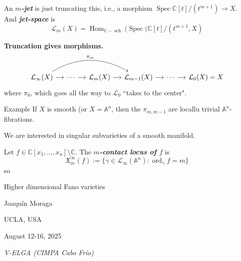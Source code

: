 \begin{defn}\leavevmode
	An \textit{\textbf{\(m\)-jet}} is just truncating this, i.e., a morphism \(\operatorname{Spec}\mathbb{C}[t]/(t^{m+1}) \to X\). And \textit{\textbf{jet-space}} is
	\[\mathcal{L}_m(X)= \operatorname{Hom}_{\mathbb{C}-\operatorname{s c h}}(\operatorname{Spec}(\mathbb{C}[t]/(t^{m+1},X)\]
\end{defn}

\textbf{Truncation gives morphisms.} 
\[\begin{tikzcd}[column sep=small]
	\mathcal{L}_\infty(X)\arrow[r]\arrow[rrr,bend left,"\pi_m"]&\cdots \arrow[r]&\mathcal{L}_m(X)\arrow[r]&\mathcal{L}_{m-1}(X)\arrow[r]&\cdots \arrow[r]&\mathcal{L}_0(X)=X
\end{tikzcd}\]
where \(\pi_0\), which goes all the way to \(\mathcal{L}_0\) ``takes to the center".
\begin{thing4}{Example}\leavevmode
If \(X\) is smooth (or \(X= \mathbb{A}^n\), then the  \(\pi_{m,m-1}\) are locallu trivial \(\mathbb{A}^n\)-fibrations.
\end{thing4}

{\color{6}We are interested in singular subvarieties of a smooth manifold.}

\begin{defn}\leavevmode
	Let \(f \in \mathbb{C}[x_1,\ldots,x_n]\setminus \mathbb{C}\). The \textit{\textbf{\(m\)-contact locus of \(f\)}} is
	\[\mathfrak{X}_{m}^\infty(f):=\{\gamma \in \mathcal{L}_\infty(\mathbb{A}^n): \operatorname{ord}_\gamma f=m\}\]
	so
\end{defn}\fi

\clearpage{}
{\Huge Higher dimensional Fano varieties}

\hfill{\Large Joaquín Moraga}

{\Large \hfill UCLA, USA}

\hfill{\large August 12-16, 2025

\hfill \textit{V-ELGA (CIMPA Cabo Frío)}}

\vspace{2em}


